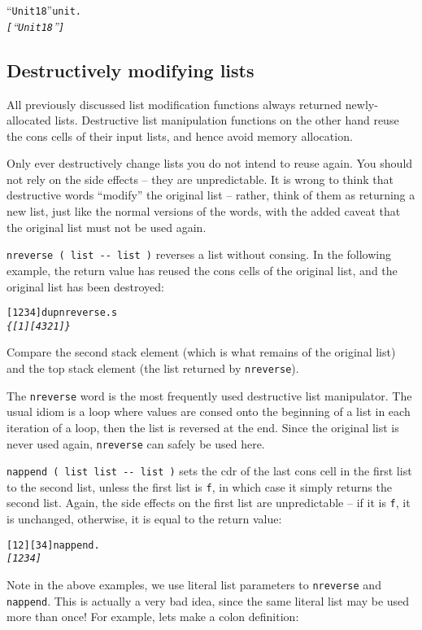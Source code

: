 \documentclass[english]{article}
\begin{document}
\begin{alltt}
{}``Unit 18'' unit .
\emph{{[} {}``Unit 18'' {]}}
\end{alltt}

\subsection{\label{sub:Destructively-modifying-lists}Destructively modifying lists}

All previously discussed list modification functions always returned
newly-allocated lists. Destructive list manipulation functions on
the other hand reuse the cons cells of their input lists, and hence
avoid memory allocation.

Only ever destructively change lists you do not intend to reuse again.
You should not rely on the side effects -- they are unpredictable.
It is wrong to think that destructive words {}``modify'' the original
list -- rather, think of them as returning a new list, just like the
normal versions of the words, with the added caveat that the original
list must not be used again.

\texttt{nreverse ( list -{}- list )} reverses a list without consing.
In the following example, the return value has reused the cons cells of
the original list, and the original list has been destroyed:

\begin{alltt}
{[} 1 2 3 4 {]} dup nreverse .s
\emph{\{ {[} 1 {]} {[} 4 3 2 1 {]} \}}
\end{alltt}
Compare the second stack element (which is what remains of the original
list) and the top stack element (the list returned by \texttt{nreverse}).

The \texttt{nreverse} word is the most frequently used destructive
list manipulator. The usual idiom is a loop where values are consed
onto the beginning of a list in each iteration of a loop, then the
list is reversed at the end. Since the original list is never used
again, \texttt{nreverse} can safely be used here.

\texttt{nappend ( list list -{}- list )} sets the cdr of the last
cons cell in the first list to the second list, unless the first list
is \texttt{f}, in which case it simply returns the second list. Again,
the side effects on the first list are unpredictable -- if it is \texttt{f},
it is unchanged, otherwise, it is equal to the return value:

\begin{alltt}
{[} 1 2 {]} {[} 3 4 {]} nappend .
\emph{{[} 1 2 3 4 {]}}
\end{alltt}
Note in the above examples, we use literal list parameters to \texttt{nreverse}
and \texttt{nappend}. This is actually a very bad idea, since the same literal
list may be used more than once! For example, lets make a colon definition:
\end{document}
